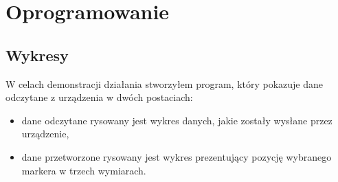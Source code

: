 \section{Oprogramowanie}
\subsection{Wykresy}
W celach demonstracji działania stworzyłem program, który pokazuje dane odczytane z urządzenia w dwóch postaciach:
\begin{itemize}
 \item dane odczytane \ppauza rysowany jest wykres danych, jakie zostały wysłane przez urządzenie,
 \item dane przetworzone \ppauza rysowany jest wykres prezentujący pozycję wybranego markera w trzech wymiarach.
\end{itemize}
